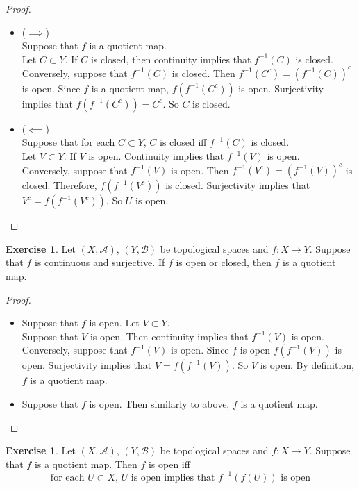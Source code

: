 \documentclass[12pt]{amsart}
\theoremstyle{definition}
\newtheorem{ex}[definition]{Exercise}
\newcommand{\MA}{\mathcal{A}}
\newcommand{\MB}{\mathcal{B}}
\DeclareMathOperator*{\0}{\mbf{0}}
\DeclareMathOperator*{\1}{\mbf{1}}
\newcommand{\lex}[1]{\label{ex:#1}}
\begin{document}
	\begin{proof}\
	\begin{itemize}
	\item ($\implies$) \\
	Suppose that $f$ is a quotient map.\\
	Let $C \subset Y$. If $C$ is closed, then continuity implies that $f^{-1}(C)$ is closed.\\ 
	Conversely, suppose that $f^{-1}(C)$ is closed. Then $f^{-1}(C^c) = (f^{-1}(C))^c$ is open. Since $f$ is a quotient map, $f(f^{-1}(C^c))$ is open. Surjectivity implies that $f(f^{-1}(C^c)) = C^c$. So $C$ is closed. 
	\item ($\impliedby$) \\
	Suppose that for each $C \subset Y$, $C$ is closed iff $f^{-1}(C)$ is closed. \\
	Let $V \subset Y$. If $V$ is open. Continuity implies that $f^{-1}(V)$ is open.\\ 
	Conversely, suppose that $f^{-1}(V)$ is open. Then $ f^{-1}(V^c) = (f^{-1}(V))^c$ is closed. Therefore, $f(f^{-1}(V^c))$ is closed. Surjectivity implies that $V^c = f(f^{-1}(V^c))$. So $U$ is open.
	\end{itemize}
	\end{proof}
	
	\begin{ex} \lex{34004}
	Let $(X, \MA)$, $(Y, \MB)$ be topological spaces and $f:X \rightarrow Y$. Suppose that $f$ is continuous and surjective. If $f$ is open or closed, then $f$ is a quotient map. 
	\end{ex}
	
	\begin{proof}\
	\begin{itemize}	
	\item Suppose that $f$ is open. Let $V \subset Y$. \\
	Suppose that $V$ is open. Then continuity implies that $f^{-1}(V)$ is open. Conversely, suppose that $f^{-1}(V)$ is open. Since $f$ is open $f(f^{-1}(V))$ is open. Surjectivity implies that $V = f(f^{-1}(V))$. So $V$ is open. By definition, $f$ is a quotient map.\\
	\item   
	Suppose that $f$ is open. Then similarly to above, $f$ is a quotient map.
	\end{itemize}
	\end{proof}
	
	\begin{ex} \lex{34005}
	Let $(X, \MA)$, $(Y, \MB)$ be topological spaces and $f:X \rightarrow Y$. Suppose that $f$ is a quotient map. Then $f$ is open iff 
	\begin{equation*}
	\text{for each $U \subset X$, $U$ is open implies that $f^{-1}(f(U))$ is open} 
	\end{equation*}
	\end{ex}
	
\end{document}
